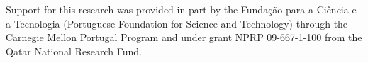 Support for this research was provided in part by the Funda\c{c}\~{a}o para a Ci\^{e}ncia e a Tecnologia (Portuguese Foundation for Science and Technology) through the Carnegie Mellon Portugal Program and under grant NPRP 09-667-1-100 from the Qatar National Research Fund.
